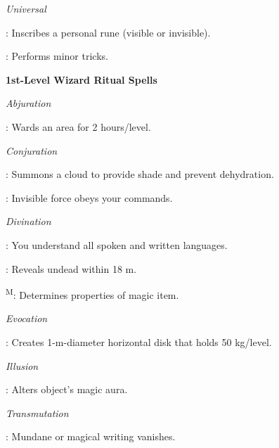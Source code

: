 \noindent\textit{Universal}
\begin{itemize*}
	\item[] : Inscribes a personal rune (visible or invisible).
	\item[] : Performs minor tricks.
\end{itemize*}


\noindent\textbf{1st-Level Wizard Ritual Spells}

\noindent\textit{Abjuration}
\begin{itemize*}
	\item[] : Wards an area for 2 hours/level.
\end{itemize*}

\noindent\textit{Conjuration}
\begin{itemize*}
	\item[] : Summons a cloud to provide shade and prevent dehydration. %
	\item[] : Invisible force obeys your commands.
\end{itemize*}

\noindent\textit{Divination}
\begin{itemize*}
	\item[] : You understand all spoken and written languages.
	\item[] : Reveals undead within 18 m.
	\item[] \textsuperscript{M}: Determines properties of magic item.
\end{itemize*}

\noindent\textit{Evocation}
\begin{itemize*}
	\item[] : Creates 1-m-diameter horizontal disk that holds 50 kg/level.
\end{itemize*}

\noindent\textit{Illusion}
\begin{itemize*}
	\item[] : Alters object's magic aura.
\end{itemize*}

\noindent\textit{Transmutation}
\begin{itemize*}
	\item[] : Mundane or magical writing vanishes.
\end{itemize*}


